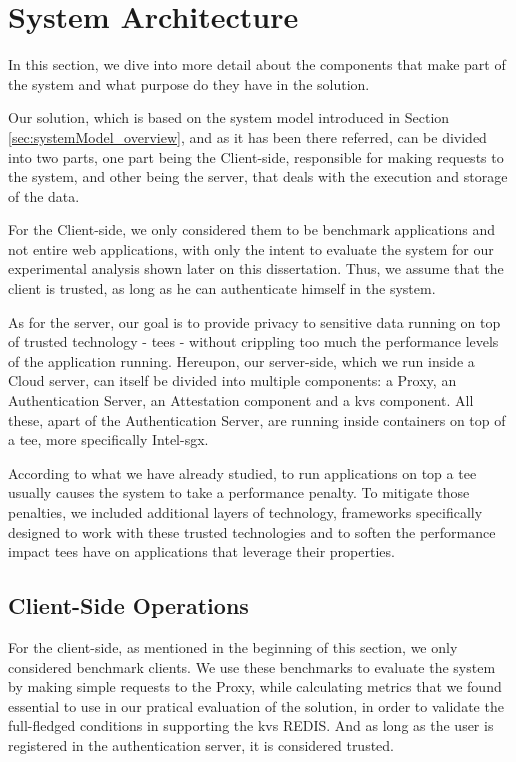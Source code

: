 \section{System Architecture}
\label{sec:systemArchitecture}
In this section, we dive into more detail about the components that make part of the system and what purpose do they have in the solution.  

Our solution, which is based on the system model introduced in Section \ref{sec:systemModel_overview}, and as it has been there referred, can be divided into two parts, one part being the Client-side, responsible for making requests to the system, and other being the server, that deals with the execution and storage of the data.

For the Client-side, we only considered them to be benchmark applications and not entire web applications, with only the intent to evaluate the system for our experimental analysis shown later on this dissertation. Thus, we assume that the client is trusted, as long as he can authenticate himself in the system.

As for the server, our goal is to provide privacy to sensitive data running on top of trusted technology - \gls{tee}s - without crippling too much the performance levels of the application running. 
Hereupon, our server-side, which we run inside a Cloud server, can itself be divided into multiple components: a Proxy, an Authentication Server, an Attestation component and a \gls{kvs} component. All these, apart of the Authentication Server, are running inside containers on top of a \gls{tee}, more specifically Intel-\gls{sgx}.

According to what we have already studied, to run applications on top a \gls{tee} usually causes the system to take a performance penalty. To mitigate those penalties, we included additional layers of technology, frameworks specifically designed to work with these trusted technologies and to soften the performance impact \gls{tee}s have on applications that leverage their properties. 

\subsection{Client-Side Operations}

For the client-side, as mentioned in the beginning of this section, we only considered benchmark clients. We use these benchmarks to evaluate the system by making simple requests to the Proxy, while calculating metrics that we found essential to use in our pratical evaluation of the solution, in order to validate the full-fledged conditions in supporting the \gls{kvs} REDIS. And as long as the user is registered in the authentication server, it is considered trusted.

